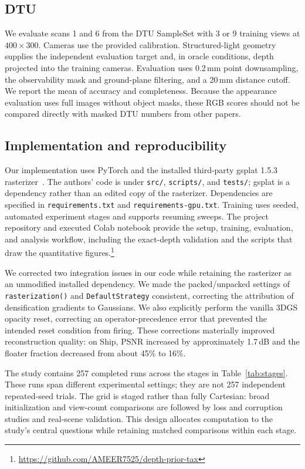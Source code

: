 \documentclass[10pt,a4paper]{article}
\begin{document}
\subsection{DTU}

We evaluate scans 1 and 6 from the DTU SampleSet with 3 or 9 training views at
$400\times300$. Cameras use the provided calibration. Structured-light geometry
supplies the independent evaluation target and, in oracle conditions, depth projected
into the training cameras. Evaluation uses 0.2\,mm point downsampling, the
observability mask and ground-plane filtering, and a 20\,mm distance cutoff. We report
the mean of accuracy and completeness. Because the appearance evaluation uses full
images without object masks, these RGB scores should not be compared directly with
masked DTU numbers from other papers.

\subsection{Implementation and reproducibility}

Our implementation uses PyTorch and the installed third-party gsplat 1.5.3
rasterizer~\cite{ye2025}. The authors' code is under \texttt{src/},
\texttt{scripts/}, and \texttt{tests/}; gsplat is a dependency rather than an edited
copy of the rasterizer. Dependencies are specified in \texttt{requirements.txt} and
\texttt{requirements-gpu.txt}. Training uses seeded, automated experiment stages and
supports resuming sweeps. The project repository and executed Colab notebook provide
the setup, training, evaluation, and analysis workflow, including the exact-depth
validation and the scripts that draw the quantitative figures.\footnote{\url{https://github.com/AMEER7525/depth-prior-tax}}

We corrected two integration issues in our code while retaining the rasterizer as an
unmodified installed dependency. We made the packed/unpacked settings of
\texttt{rasterization()} and \texttt{DefaultStrategy} consistent, correcting the
attribution of densification gradients to Gaussians. We also explicitly perform the
vanilla 3DGS opacity reset, correcting an operator-precedence error that prevented the
intended reset condition from firing. These corrections materially improved
reconstruction quality: on Ship, PSNR increased by approximately 1.7\,dB and the
floater fraction decreased from about 45\% to 16\%.

The study contains 257 completed runs across the stages in Table~\ref{tab:stages}.
These runs span different experimental settings; they are not 257 independent
repeated-seed trials. The grid is staged rather than fully Cartesian: broad
initialization and view-count comparisons are followed by loss and corruption studies
and real-scene validation. This design allocates computation to the study's central
questions while retaining matched comparisons within each stage.
\end{document}
